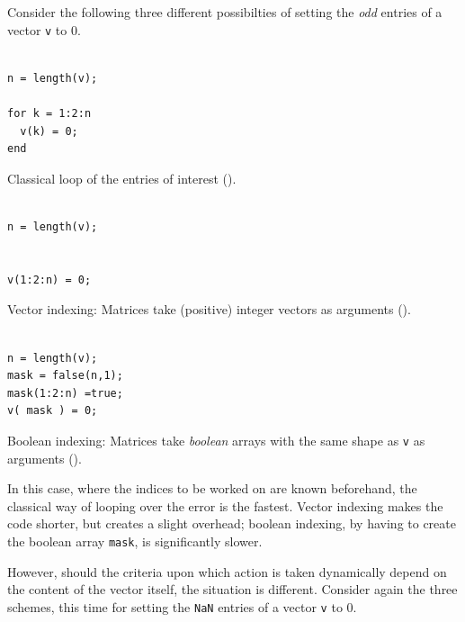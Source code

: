 Consider the following three different possibilties of setting the \emph{odd}
entries of a vector \lstinline!v! to $0$.

\hfill
\begin{minipage}[t]{.29\textwidth}
\begin{lstlisting}[framerule=1pt,rulecolor=\color{goodgreen}]
% [...] create v

n = length(v);

for k = 1:2:n
  v(k) = 0;
end
\end{lstlisting}
Classical loop of the entries of interest ().
\end{minipage}
\hfill
\begin{minipage}[t]{.29\textwidth}
\begin{lstlisting}[framerule=1pt,rulecolor=\color{mediocre}]
% [...] create v

n = length(v);


v(1:2:n) = 0;

\end{lstlisting}
Vector indexing: Matrices take (positive) integer vectors as arguments
().
\end{minipage}
\hfill
\begin{minipage}[t]{.29\textwidth}
\begin{lstlisting}[framerule=1pt,rulecolor=\color{badred}]
% [...] create v

n = length(v);
mask = false(n,1);
mask(1:2:n) =true;
v( mask ) = 0;

\end{lstlisting}
Boolean indexing: Matrices take \emph{boolean} arrays\footnotemark{} with the
same shape as \lstinline!v! as arguments ().
\end{minipage}
\hfill
{}

In this case, where the indices to be worked on are known beforehand, the
classical way of looping over the error is the fastest. Vector indexing makes
the code shorter, but creates a slight overhead; boolean indexing, by having to
create the boolean array \lstinline!mask!, is significantly slower.

However, should the criteria upon which action is taken dynamically depend on
the content of the vector itself, the situation is different.  Consider again
the three schemes, this time for setting the \lstinline!NaN! entries of a
vector \lstinline!v! to $0$.


